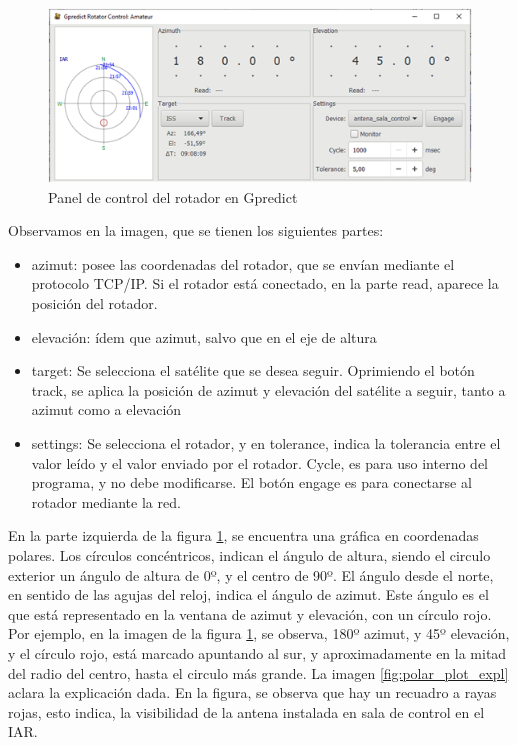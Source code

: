 \begin{figure}[ht]
	\includegraphics{rotador_select}
	\caption{Panel de control del rotador en Gpredict}
	\label{fig:panel_control_gpr}
\end{figure}

Observamos en la imagen, que se tienen los siguientes partes: 

\begin{itemize}	
	\item azimut: posee las coordenadas del rotador, que se envían mediante el protocolo TCP/IP. Si el rotador está conectado, en la parte read, aparece la posición del rotador.  
	\item elevación: ídem que azimut, salvo que en el eje de altura  
	\item target: Se selecciona el satélite que se desea seguir. Oprimiendo el botón track, se aplica la posición de azimut y elevación del satélite a seguir, tanto a azimut como a elevación 
	\item settings: Se selecciona el rotador, y en tolerance, indica la tolerancia entre el valor leído y el valor enviado por el rotador. Cycle, es para uso interno del programa, y no debe modificarse. El botón engage es para conectarse al rotador mediante la red.   
\end{itemize}


En la parte izquierda de la figura \ref{fig:panel_control_gpr}, se encuentra una gráfica en coordenadas polares. Los círculos concéntricos, indican el ángulo de altura, siendo el circulo exterior un ángulo de altura de 0º, y el centro de 90º. El ángulo desde el norte, en sentido de las agujas del reloj, indica el ángulo de azimut. Este ángulo es el que está representado en la ventana de azimut y elevación, con un círculo rojo. Por ejemplo, en la imagen de la figura \ref{fig:panel_control_gpr}, se observa, 180º azimut, y 45º elevación, y el círculo rojo, está marcado apuntando al sur, y aproximadamente en la mitad del radio del centro, hasta el circulo más grande. La imagen \ref{fig:polar_plot_expl} aclara la explicación dada. En la figura, se observa que hay un recuadro a rayas rojas, esto indica, la visibilidad de la antena instalada en sala de control en el IAR. 


